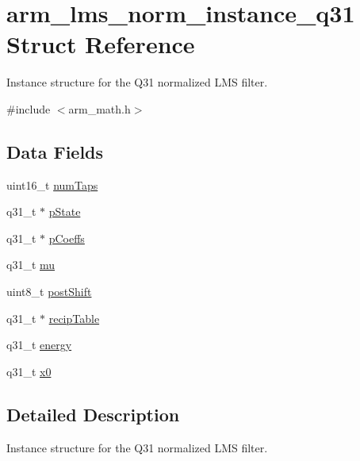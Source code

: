 \hypertarget{structarm__lms__norm__instance__q31}{}\section{arm\+\_\+lms\+\_\+norm\+\_\+instance\+\_\+q31 Struct Reference}
\label{structarm__lms__norm__instance__q31}


Instance structure for the Q31 normalized L\+MS filter.  




{\ttfamily \#include $<$arm\+\_\+math.\+h$>$}

\subsection*{Data Fields}
\begin{DoxyCompactItemize}
\item 
uint16\+\_\+t \mbox{\hyperlink{structarm__lms__norm__instance__q31_a751941891e47f522a7f5375fe8990aac}{num\+Taps}}
\item 
q31\+\_\+t $\ast$ \mbox{\hyperlink{structarm__lms__norm__instance__q31_adee4ba3ee8869865af7d8fa08ca913d6}{p\+State}}
\item 
q31\+\_\+t $\ast$ \mbox{\hyperlink{structarm__lms__norm__instance__q31_a68888e36167d81cb7836db10367a1682}{p\+Coeffs}}
\item 
q31\+\_\+t \mbox{\hyperlink{structarm__lms__norm__instance__q31_a21ab4237a726ea7751f5026d89d2e577}{mu}}
\item 
uint8\+\_\+t \mbox{\hyperlink{structarm__lms__norm__instance__q31_a74050e9f36542bd56f4052381a82ae8f}{post\+Shift}}
\item 
q31\+\_\+t $\ast$ \mbox{\hyperlink{structarm__lms__norm__instance__q31_aec8a88dd688519b6b1e3c8d2e24bb775}{recip\+Table}}
\item 
q31\+\_\+t \mbox{\hyperlink{structarm__lms__norm__instance__q31_a012fee0f71095d2557bb633e73ef7355}{energy}}
\item 
q31\+\_\+t \mbox{\hyperlink{structarm__lms__norm__instance__q31_a973b8350a0c7b113a5f002bc0b86bf76}{x0}}
\end{DoxyCompactItemize}


\subsection{Detailed Description}
Instance structure for the Q31 normalized L\+MS filter. 

